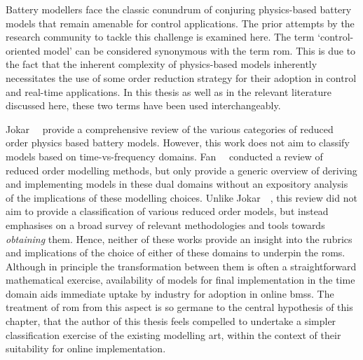
Battery modellers face the classic  conundrum of conjuring physics-based battery
models that remain amenable for control  applications. The prior attempts by the
research  community  to  tackle  this  challenge  is  examined  here.  The  term
`control-oriented model' can  be considered synonymous with  the term \gls{rom}.
This is  due to the  fact that the  inherent complexity of  physics-based models
inherently  necessitates the  use of  some  order reduction  strategy for  their
adoption in  control and real-time  applications. In this  thesis as well  as in
the  relevant  literature  discussed  here,  these  two  terms  have  been  used
interchangeably.


Jokar~\etal~\cite{Jokar2016}  provide  a  comprehensive review  of  the  various
categories  of  reduced  order  physics  based  battery  models.  However,  this
work  does  not aim  to  classify  models  based on  time-vs-frequency  domains.
Fan~\etal{}~\cite{Fan2015}  conducted  a  review   of  reduced  order  modelling
methods, but only provide a generic overview of deriving and implementing models
in these  dual domains  without an  expository analysis  of the  implications of
these modelling  choices. Unlike  Jokar~\etal~\cite{Jokar2016}, this  review did
not aim to provide a classification of various reduced order models, but instead
emphasises  on  a broad  survey  of  relevant  methodologies and  tools  towards
\emph{obtaining} them.  Hence, neither  of these works  provide an  insight into
the  rubrics and  implications  of the  choice  of either  of  these domains  to
underpin  the  \glspl{rom}. Although  in  principle  the transformation  between
them  is  often  a straightforward  mathematical  exercise,  availability of models for final  implementation in the time domain aids
immediate uptake by  industry for adoption in online  \glspl{bms}. The treatment
of \gls{rom} from  this aspect is so  germane to the central  hypothesis of this
chapter, that the author
of this thesis feels compelled to undertake a simpler classification exercise of
the existing modelling  art, within the context of their  suitability for online
implementation.


